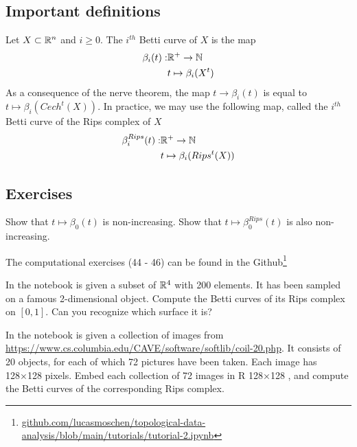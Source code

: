 \subsection{Important definitions}

\begin{definition}
    Let $X \subset \mathbb{R}^n$ and $i \ge 0$. The $i^{th}$ Betti curve of $X$ is the
    map
    \begin{align*}
        \beta_i(t) : &\mathbb{R}^+ \to \mathbb{N} \\
        &t \mapsto \beta_i(X^t)     
    \end{align*}
    As a consequence of the nerve theorem, the map $t \to \beta_i(t)$ is equal
    to $t \mapsto \beta_i(Cech^t(X)).$ In practice, we may use the following
    map, called the $i^{th}$ Betti curve of the Rips complex of $X$ 
    \begin{align*}
        \beta_i^{Rips}(t) : &\mathbb{R}^+ \to \mathbb{N} \\
        &t \mapsto \beta_i(Rips^t(X))     
    \end{align*}
\end{definition}


\subsection{Exercises}

\begin{exercise}
    Show that $t \mapsto \beta_0(t)$ is non-increasing. Show that $t \mapsto
    \beta_0^{Rips}(t)$ is also non-increasing.
\end{exercise}

\noindent\linia

The computational exercises (44 - 46) can be found in the
Github\footnote{\url{github.com/lucasmoschen/topological-data-analysis/blob/main/tutorials/tutorial-2.ipynb}}

\begin{exercise}
    In the notebook is given a subset of $\mathbb{R}^4$ with 200 elements. It has been
    sampled on a famous 2-dimensional object. Compute the Betti curves of its
    Rips complex on $[0, 1]$. Can you recognize which surface it is?
\end{exercise}

\noindent\linia

\begin{exercise}
    In the notebook is given a collection of images from
    \url{https://www.cs.columbia.edu/CAVE/software/softlib/coil-20.php}. It
    consists of 20 objects, for each of which 72 pictures have been taken.
    Each image has 128×128 pixels. Embed each collection of 72 images in R
    128×128 , and compute the Betti curves of the corresponding Rips complex.
\end{exercise}

